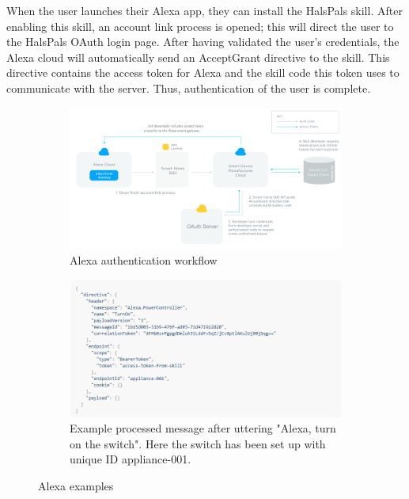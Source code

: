\documentclass[onecolumn]{IEEEtran}
\begin{document}
    When the user launches their Alexa app, they can install the HalsPals skill. After enabling this skill, an account link process is opened; this will direct the user to the HalsPals OAuth login page. After having validated the user's credentials, the Alexa cloud will automatically send an AcceptGrant directive to the skill. This directive contains the access token for Alexa and the skill code this token uses to communicate with the server. Thus, authentication of the user is complete.
    
    \begin{figure}[h]
     \begin{subfigure}{.5\textwidth}
            \centering
                \includegraphics[width=1\textwidth]{images/auth.png}
                \caption{Alexa authentication workflow}
               \label{fig:alexa autthentication flow}
            \end{subfigure}\hfill
            \begin{subfigure}{.5\textwidth}
                \centering
                \includegraphics[width=1\textwidth]{images/Alexarequest.png}
                \caption{Example processed message after uttering "Alexa, turn on the switch". Here the switch has been set up with unique ID appliance-001.}
               \label{fig:alexa switch flow}
            \end{subfigure}\hfill
        \caption{Alexa examples}
    \end{figure}
    
\end{document}
